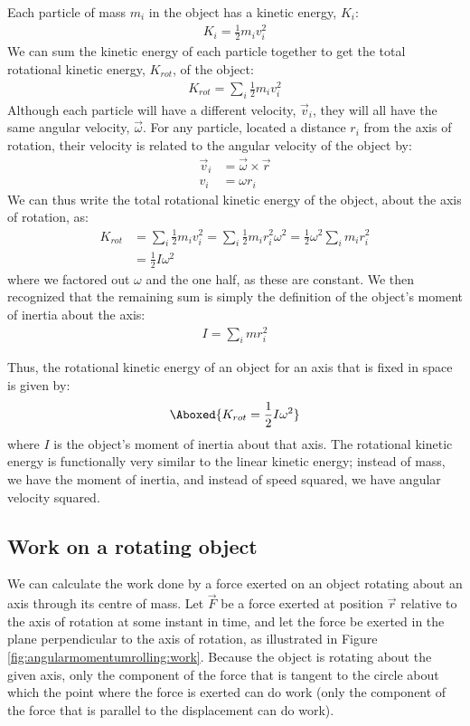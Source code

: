Each particle of mass $m_i$ in the object has a kinetic energy, $K_i$:
\begin{align*}
K_i = \frac{1}{2}m_iv_i^2
\end{align*} 
We can sum the kinetic energy of each particle together to get the total rotational kinetic energy, $K_{rot}$, of the object:
\begin{align*}
K_{rot} = \sum_i \frac{1}{2}m_iv_i^2
\end{align*}
Although each particle will have a different velocity, $\vec v_i$, they will all have the same angular velocity, $\vec\omega$. For any particle, located a distance $r_i$ from the axis of rotation, their velocity is related to the angular velocity of the object by:
\begin{align*}
\vec v_i &= \vec \omega \times \vec r\\
v_i &= \omega r_i
\end{align*}
We can thus write the total rotational kinetic energy of the object, about the axis of rotation, as:
\begin{align*}
K_{rot} &= \sum_i \frac{1}{2}m_iv_i^2 = \sum_i \frac{1}{2}m_ir_i^2\omega^2= \frac{1}{2} \omega^2 \sum_i m_ir_i^2\\
&=\frac{1}{2}I\omega^2
\end{align*}
where we factored out $\omega$ and the one half, as these are constant. We then recognized that the remaining sum is simply the definition of the object's moment of inertia about the axis:
\begin{align*}
I = \sum_i mr_i^2
\end{align*}

Thus, the rotational kinetic energy of an object for an axis that is fixed in space is given by:
\begin{align}
\Aboxed{K_{rot}=\frac{1}{2}I\omega^2}
\end{align}
where $I$ is the object's moment of inertia about that axis. The rotational kinetic energy is functionally very similar to the linear kinetic energy; instead of mass, we have the moment of inertia, and instead of speed squared, we have angular velocity squared. 

\subsection{Work on a rotating object}
We can calculate the work done by a force exerted on an object rotating about an axis through its centre of mass. Let $\vec F$ be a force exerted at position $\vec r$ relative to the axis of rotation at some instant in time, and let the force be exerted in the plane perpendicular to the axis of rotation, as illustrated in Figure \ref{fig:angularmomentumrolling:work}. Because the object is rotating about the given axis, only the component of the force that is tangent to the circle about which the point where the force is exerted can do work (only the component of the force that is parallel to the displacement can do work). 

